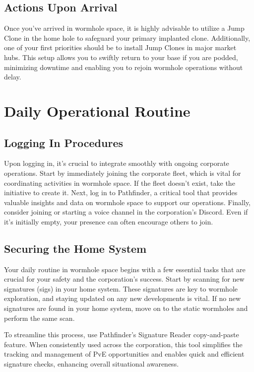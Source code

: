 \documentclass[a4paper,12pt]{report}
\begin{document}
\section{Actions Upon Arrival}

Once you’ve arrived in wormhole space, it is highly advisable to utilize a Jump Clone in the home hole to safeguard your primary implanted clone. Additionally, one of your first priorities should be to install Jump Clones in major market hubs. This setup allows you to swiftly return to your base if you are podded, minimizing downtime and enabling you to rejoin wormhole operations without delay.

\chapter{Daily Operational Routine}

\section{Logging In Procedures}

Upon logging in, it’s crucial to integrate smoothly with ongoing corporate operations. Start by immediately joining the corporate fleet, which is vital for coordinating activities in wormhole space. If the fleet doesn’t exist, take the initiative to create it. Next, log in to Pathfinder, a critical tool that provides valuable insights and data on wormhole space to support our operations. Finally, consider joining or starting a voice channel in the corporation’s Discord. Even if it’s initially empty, your presence can often encourage others to join.

\section{Securing the Home System}

Your daily routine in wormhole space begins with a few essential tasks that are crucial for your safety and the corporation’s success. Start by scanning for new signatures (sigs) in your home system. These signatures are key to wormhole exploration, and staying updated on any new developments is vital. If no new signatures are found in your home system, move on to the static wormholes and perform the same scan.

To streamline this process, use Pathfinder’s Signature Reader copy-and-paste feature. When consistently used across the corporation, this tool simplifies the tracking and management of PvE opportunities and enables quick and efficient signature checks, enhancing overall situational awareness.
\end{document}
